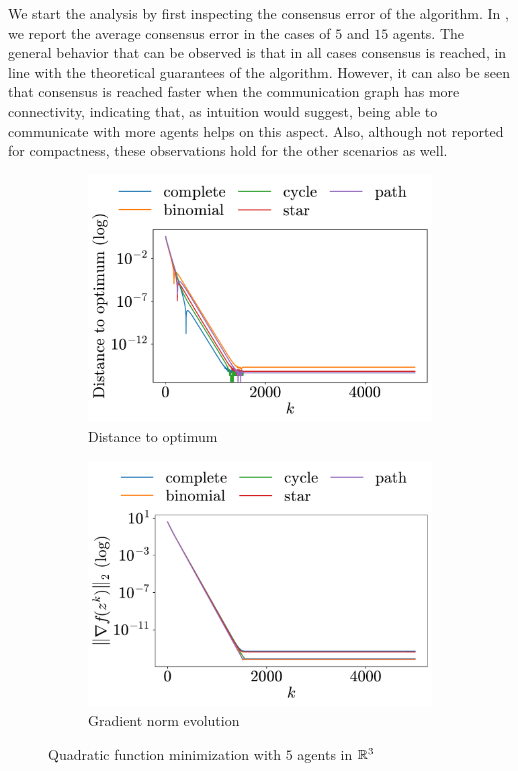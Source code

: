 \documentclass[a4paper,11pt,oneside]{book}
\begin{document}
We start the analysis by first inspecting the consensus error of the algorithm. In , we report the average consensus error in the cases of $5$ and $15$ agents. The general behavior that can be observed is that in all cases consensus is reached, in line with the theoretical guarantees of the algorithm. However, it can also be seen that consensus is reached faster when the communication graph has more connectivity, indicating that, as intuition would suggest, being able to communicate with more agents helps on this aspect. Also, although not reported for compactness, these observations hold for the other scenarios as well.


\begin{figure}[h!]
      \centering
      \begin{subfigure}[h]{0.42\linewidth}
            \centering
            \includegraphics[width=\linewidth]{./figs/quadratic/5_3/distance.pdf} 
            \caption{Distance to optimum}
      \end{subfigure}
      \hfill
      \begin{subfigure}[h]{0.42\linewidth}
            \centering
            \includegraphics[width=\linewidth]{./figs/quadratic/5_3/gradient.pdf} 
            \caption{Gradient norm evolution}
      \end{subfigure}
      \caption{Quadratic function minimization with $5$ agents in ${\mathbb{R}}^{3}$}
      \label{fig:quadratic_5_3}
\end{figure}
\end{document}
